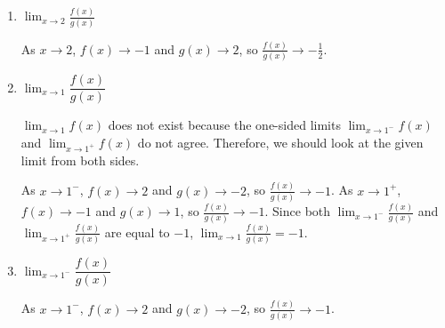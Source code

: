 \documentclass{article}
\begin{document}
\begin{enumerate}
\begin{enumerate}
      \begin{solution}
        $1$
      \end{solution}

    \item

      \begin{problem}[0.65in]
        $\displaystyle \lim_{x \to 2} \frac{f(x)}{g(x)}$
      \end{problem}

      \begin{solution}
        As $x \to 2$, $f(x) \to -1$ and $g(x) \to 2$, so $\displaystyle
        \frac{f(x)}{g(x)} \to \boxed{-\frac{1}{2}}$.
      \end{solution}

    \item \label{limit-laws-graphical-1c}


      \begin{problem}[0.65in]
        $\displaystyle \lim_{x \to 1} \dfrac{f(x)}{g(x)}$
      \end{problem}

      \begin{solution}
        $\displaystyle \lim_{x \to 1} f(x)$ does not exist because the one-sided limits $\displaystyle \lim_{x \to 1^-} f(x)$ and $\displaystyle \lim_{x \to 1^+} f(x)$ do not agree. Therefore, we should look at the given limit from both sides.

        As $x \to 1^-$, $f(x) \to 2$ and $g(x) \to -2$, so $\frac{f(x)}{g(x)} \to -1$. As $x \to 1^+$, $f(x) \to -1$ and $g(x) \to 1$, so $\frac{f(x)}{g(x)} \to -1$. Since both $\displaystyle \lim_{x \to 1^-} \frac{f(x)}{g(x)}$ and $\displaystyle \lim_{x \to 1^+} \frac{f(x)}{g(x)}$ are equal to $-1$, $\displaystyle \lim_{x \to 1} \frac{f(x)}{g(x)} = \boxed{-1}$.
      \end{solution}

    \item

      \begin{problem}[0.65in]
        $\displaystyle \lim_{x \to 1^-} \dfrac{f(x)}{g(x)}$
      \end{problem}

      \begin{solution}
        As $x \to 1^-$, $f(x) \to 2$ and $g(x) \to -2$, so $\frac{f(x)}{g(x)} \to -1$.
      \end{solution}


\end{enumerate}
\end{enumerate}
\end{document}
